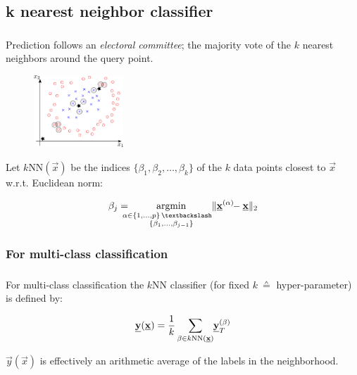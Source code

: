 \subsection{k nearest neighbor classifier}

\begin{frame}\frametitle{\subsecname}
Prediction follows an \emph{electoral committee}; the majority vote of the $k$ nearest neighbors around the query point.

\begin{figure}[h]
	\includegraphics[width=0.3\textwidth]{img/knn}
	\mode<article>{
	\caption{$k$NN with $k=3$}
	}
\end{figure}

Let $k$NN$(\vec x)$ be the indices $\{\beta_1, \beta_2,\ldots,\beta_k\}$ of the $k$ data points closest to $\vec x$ w.r.t. Euclidean norm:

\begin{equation}
\beta_j = 
\argmin_{\substack{\kern-2ex \alpha \in \{1,\ldots,p\} \,\textbackslash\\ \{\beta_{1},\ldots,\beta_{j-1}\}}}
\lVert \vec x^{(\alpha)} \kern-.8ex - \vec x\rVert_{2}
\end{equation}

\end{frame}

\subsubsection{For multi-class classification}

\begin{frame}\frametitle{\subsubsecname}

For multi-class classification the $k$NN classifier (for fixed $k~\corresponds$ hyper-parameter) is defined by:

\begin{equation}
\vec y(\vec x) = \frac{1}{k} \sum_{\beta \in k\mathrm{NN}(\vec x)} \kern-0.5ex \vec y_{T}^{(\beta)}
\label{eq:knn_classifier}
\end{equation}

$\vec y(\vec x)$  is effectively an arithmetic average of the labels in the neighborhood.

\end{frame}

